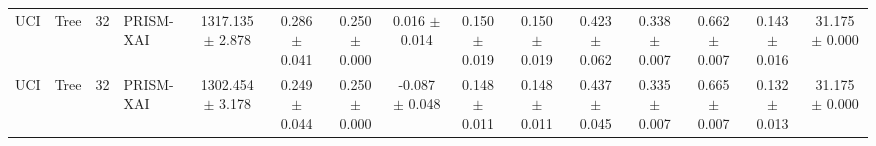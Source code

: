 \begin{table}[t]
\begin{tabular}{llllccccccccccc}
UCI & Tree & 32 & PRISM-XAI & 1317.135 $\pm$ 2.878 & 0.286 $\pm$ 0.041 & 0.250 $\pm$ 0.000 & 0.016 $\pm$ 0.014 & 0.150 $\pm$ 0.019 & 0.150 $\pm$ 0.019 & 0.423 $\pm$ 0.062 & 0.338 $\pm$ 0.007 & 0.662 $\pm$ 0.007 & 0.143 $\pm$ 0.016 & 31.175 $\pm$ 0.000 \\
UCI & Tree & 32 & PRISM-XAI & 1302.454 $\pm$ 3.178 & 0.249 $\pm$ 0.044 & 0.250 $\pm$ 0.000 & -0.087 $\pm$ 0.048 & 0.148 $\pm$ 0.011 & 0.148 $\pm$ 0.011 & 0.437 $\pm$ 0.045 & 0.335 $\pm$ 0.007 & 0.665 $\pm$ 0.007 & 0.132 $\pm$ 0.013 & 31.175 $\pm$ 0.000 \\
\bottomrule
\end{tabular}
\end{table}
